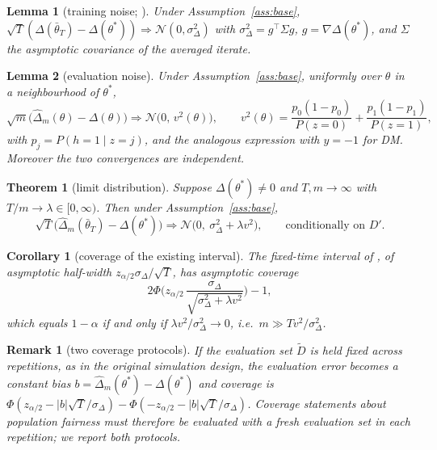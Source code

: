 \documentclass[11pt]{article}
\newtheorem{theorem}{Theorem}
\newtheorem{lemma}{Lemma}
\newtheorem{corollary}{Corollary}
\newtheorem{remark}{Remark}
\newcommand{\dhat}{\hat\Delta}
\newcommand{\tbar}{\bar\theta}
\newcommand{\Dp}{D'}
\newcommand{\Dt}{\tilde D}
\begin{document}
\begin{lemma}[training noise; \citealp{roy2026uq}]
\label{lem:train}
Under Assumption~\ref{ass:base},
$\sqrt T(\Delta(\tbar_T)-\Delta(\theta^*))\Rightarrow\mathcal N(0,\sigma^2_\Delta)$ with
$\sigma^2_\Delta=g^\top\Sigma g$, $g=\nabla\Delta(\theta^*)$, and $\Sigma$ the asymptotic covariance
of the averaged iterate.
\end{lemma}

\begin{lemma}[evaluation noise]
\label{lem:eval}
Under Assumption~\ref{ass:base}, uniformly over $\theta$ in a neighbourhood of $\theta^*$,
\[
\sqrt m\big(\dhat_m(\theta)-\Delta(\theta)\big)\Rightarrow\mathcal N\!\big(0,\,v^2(\theta)\big),
\qquad
v^2(\theta)=\frac{p_0(1-p_0)}{P(z=0)}+\frac{p_1(1-p_1)}{P(z=1)},
\]
with $p_j=P(h=1\mid z=j)$, and the analogous expression with $y=-1$ for DM.  Moreover the two
convergences are independent.
\end{lemma}

\begin{theorem}[limit distribution]
\label{thm:limit}
Suppose $\Delta(\theta^*)\neq0$ and $T,m\to\infty$ with $T/m\to\lambda\in[0,\infty)$.  Then under
Assumption~\ref{ass:base},
\[
\sqrt T\big(\dhat_m(\tbar_T)-\Delta(\theta^*)\big)\Rightarrow
\mathcal N\big(0,\ \sigma^2_\Delta+\lambda v^2\big),
\qquad\text{conditionally on }\Dp.
\]
\end{theorem}

\begin{corollary}[coverage of the existing interval]
\label{cor:coverage}
The fixed-time interval of \citet{roy2026uq}, of asymptotic half-width
$z_{\alpha/2}\sigma_\Delta/\sqrt T$, has asymptotic coverage
\[
2\Phi\!\Big(z_{\alpha/2}\,\frac{\sigma_\Delta}{\sqrt{\sigma^2_\Delta+\lambda v^2}}\Big)-1,
\]
which equals $1-\alpha$ if and only if $\lambda v^2/\sigma_\Delta^2\to0$, i.e.\
$m\gg T v^2/\sigma_\Delta^2$.
\end{corollary}

\begin{remark}[two coverage protocols]
\label{rem:protocol}
If the evaluation set $\Dt$ is held fixed across repetitions, as in the original simulation design,
the evaluation error becomes a constant bias $b=\dhat_m(\theta^*)-\Delta(\theta^*)$ and coverage is
$\Phi(z_{\alpha/2}-|b|\sqrt T/\sigma_\Delta)-\Phi(-z_{\alpha/2}-|b|\sqrt T/\sigma_\Delta)$.
Coverage statements about population fairness must therefore be evaluated with a fresh evaluation
set in each repetition; we report both protocols.
\end{remark}
\end{document}
